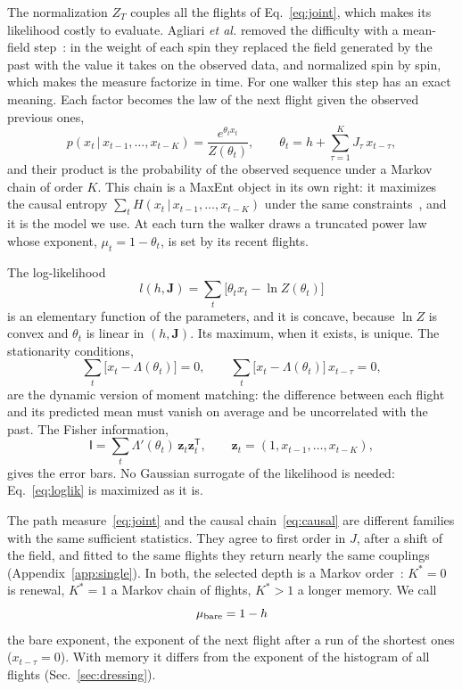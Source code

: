 The normalization $Z_T$ couples all the flights of Eq.~\eqref{eq:joint}, which makes its likelihood costly to evaluate. Agliari \emph{et al.} removed the difficulty with a mean-field step~\cite{Agliari2024}: in the weight of each spin they replaced the field generated by the past with the value it takes on the observed data, and normalized spin by spin, which makes the measure factorize in time. For one walker this step has an exact meaning. Each factor becomes the law of the next flight given the observed previous ones,
\begin{equation}
p(x_t\,|\,x_{t-1},\dots,x_{t-K})=\frac{e^{\theta_tx_t}}{Z(\theta_t)},\qquad
\theta_t=h+\sum_{\tau=1}^KJ_\tau\,x_{t-\tau},
\label{eq:causal}
\end{equation}
and their product is the probability of the observed sequence under a Markov chain of order $K$. This chain is a MaxEnt object in its own right: it maximizes the causal entropy $\sum_tH(x_t\,|\,x_{t-1},\dots,x_{t-K})$ under the same constraints~\cite{Ziebart2013}, and it is the model we use. At each turn the walker draws a truncated power law whose exponent, $\mu_t=1-\theta_t$, is set by its recent flights.

The log-likelihood
\begin{equation}
l(h,\bm J)=\sum_t\big[\theta_tx_t-\ln Z(\theta_t)\big]
\label{eq:loglik}
\end{equation}
is an elementary function of the parameters, and it is concave, because $\ln Z$ is convex and $\theta_t$ is linear in $(h,\bm J)$. Its maximum, when it exists, is unique. The stationarity conditions,
\begin{equation}
\sum_t\big[x_t-\Lambda(\theta_t)\big]=0,\qquad\sum_t\big[x_t-\Lambda(\theta_t)\big]\,x_{t-\tau}=0,
\label{eq:score}
\end{equation}
are the dynamic version of moment matching: the difference between each flight and its predicted mean must vanish on average and be uncorrelated with the past. The Fisher information,
\begin{equation}
\mathsf I=\sum_t\Lambda'(\theta_t)\,\bm z_t\bm z_t^{\mathsf T},\qquad \bm z_t=(1,x_{t-1},\dots,x_{t-K}),
\label{eq:fisher}
\end{equation}
gives the error bars. No Gaussian surrogate of the likelihood is needed: Eq.~\eqref{eq:loglik} is maximized as it is.

The path measure~\eqref{eq:joint} and the causal chain~\eqref{eq:causal} are different families with the same sufficient statistics. They agree to first order in $J$, after a shift of the field, and fitted to the same flights they return nearly the same couplings (Appendix~\ref{app:single}). In both, the selected depth is a Markov order~\cite{Ge2012}: $K^*=0$ is renewal, $K^*=1$ a Markov chain of flights, $K^*>1$ a longer memory. We call
\begin{equation}
\mu_{\rm bare}=1-h
\end{equation}
the bare exponent, the exponent of the next flight after a run of the shortest ones ($x_{t-\tau}=0$). With memory it differs from the exponent of the histogram of all flights (Sec.~\ref{sec:dressing}).

